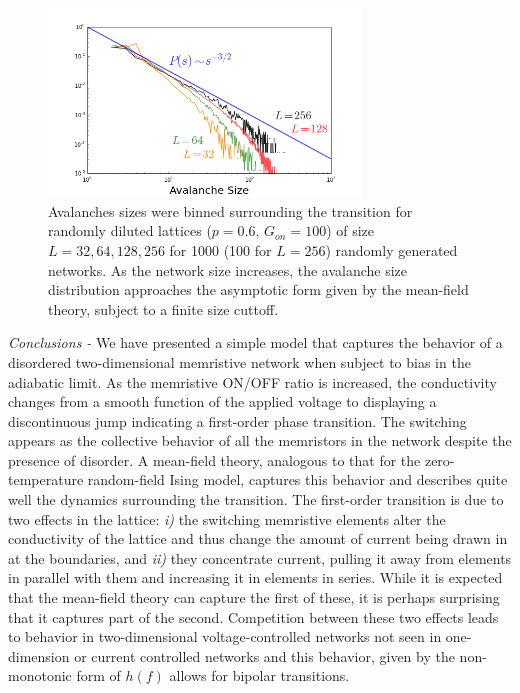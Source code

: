 \documentclass[aps,prl,reprint,groupedaddress]{revtex4-1}
\begin{document}
\begin{figure}
\includegraphics[width=8.3cm]{Avalanche_Size_Dist-2.png}
\caption{Avalanches sizes were binned surrounding the transition for randomly
diluted lattices ($p=0.6,\,G_{on}=100$) of size $L=32, 64, 128, 256$ for 1000
(100 for $L=256$) randomly generated networks.  As the network size increases,
the avalanche size distribution approaches the asymptotic form given by the
mean-field theory, subject to a finite size cuttoff.
\label{Avalanche_fig}}
\end{figure}

{\it Conclusions - } We have presented a simple model that captures the behavior of a disordered two-dimensional memristive
network when subject to bias in the adiabatic limit.  As the memristive ON/OFF ratio is increased,
the conductivity changes from a smooth function of the applied voltage to
displaying a discontinuous jump indicating a first-order phase transition. The switching appears as the collective behavior of all the memristors 
in the network despite the presence of disorder. 
A mean-field theory, analogous to that for the zero-temperature random-field Ising model, captures this behavior and describes quite well the dynamics
surrounding the transition.  The first-order transition is
due to two effects in the lattice: {\it i)} the switching memristive elements alter the
conductivity of the lattice and thus change the amount of current being drawn
in at the boundaries, and {\it ii)} they concentrate current, pulling it away from
elements in parallel with them and increasing it in elements in series. While
it is expected that the mean-field theory can capture the first of these, it
is perhaps surprising that it captures part of the second.  Competition
between these two effects leads to behavior in two-dimensional 
voltage-controlled networks not seen in one-dimension or current controlled
networks and this behavior, given by the non-monotonic form of $h(f)$ allows
for bipolar transitions.
\end{document}

